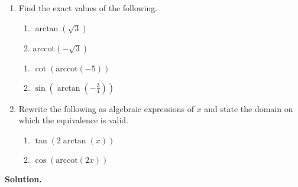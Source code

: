 \documentclass[12pt]{ximera}
\begin{document}
\begin{example}  $~$

\begin{enumerate}

\item  Find the exact values of the following.

\begin{multicols}{2}

\begin{enumerate}

\item $\arctan(\sqrt{3})$
\item  $\mbox{arccot}(-\sqrt{3})$

\setcounter{HW}{\value{enumii}}

\end{enumerate}

\end{multicols}

\begin{multicols}{2}

\begin{enumerate}

\setcounter{enumii}{\value{HW}}

\item  $\cot(\mbox{arccot}(-5))$
\item  $\sin\left(\arctan\left(-\frac{3}{4}\right)\right)$

\end{enumerate}

\end{multicols}

\item  Rewrite the following as algebraic expressions of $x$ and state the domain on which the equivalence is valid.

\begin{multicols}{2}

\begin{enumerate}

\item  $\tan(2 \arctan(x))$

\item  $\cos(\mbox{arccot}(2x))$ 

\end{enumerate}

\end{multicols}

\end{enumerate}

{\bf Solution.}


\end{example}
\end{document}
